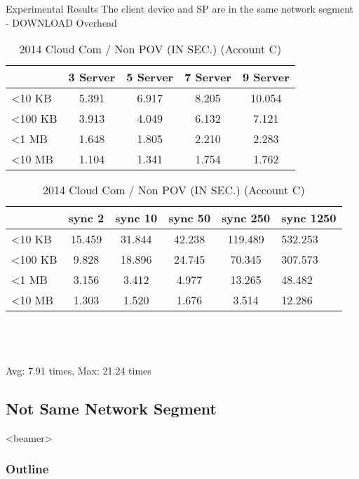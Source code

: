 \begin{frame}{Experimental Results}
{The client device and SP are in the same network segment - DOWNLOAD Overhead}
	\scriptsize
    \begin{table}[]
    \centering
    \caption{My Method / Non POV (IN SEC.) (Account C)}
    \begin{tabular}{lcccc}
                         & 3 Server & 5 Server & 7 Server & 9 Server  \\ \hline
        \textless 10 KB  & 5.391 & 6.917 & 8.205 & 10.054 \\ \hline
        \textless 100 KB & 3.913 & 4.049 & 6.132 & 7.121  \\ \hline
        \textless 1 MB   & 1.648 & 1.805 & 2.210 & 2.283  \\ \hline
        \textless 10 MB  & 1.104 & 1.341 & 1.754 & 1.762  \\ \hline
    \end{tabular}
    \caption{2014 Cloud Com / Non POV (IN SEC.) (Account C)}
    \begin{tabular}{lccccl}
                         & sync 2    & sync 10   & sync 50   & sync 250   & sync 1250  \\ \hline
        \textless 10 KB  & 15.459 & 31.844 & 42.238 & 119.489 & 532.253 \\ \hline
        \textless 100 KB & 9.828  & 18.896 & 24.745 & 70.345  & 307.573 \\ \hline
        \textless 1 MB   & 3.156  & 3.412  & 4.977  & 13.265  & 48.482  \\ \hline
        \textless 10 MB  & 1.303  & 1.520  & 1.676  & 3.514   & 12.286  \\ \hline
    \end{tabular}
    ~\\
    ~\\
    ~\\
    \alert{Avg: 7.91 times, Max: 21.24 times}
    \end{table}
\end{frame}

\subsection{Not Same Network Segment}
\begin{frame}<beamer>
    \frametitle{Outline}
    \tableofcontents[currentsubsection]
\end{frame}

